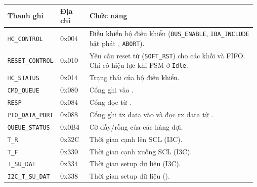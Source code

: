 \begin{longtable}{L{4.6cm} C{2.0cm} L{6.4cm}}
	\toprule
	\textbf{Thanh ghi}       & \textbf{Địa chỉ} & \textbf{Chức năng}                                                                                                          \\
	\midrule
	\endhead
	\texttt{HC\_CONTROL}     & 0x004            & Điều khiển bộ điều khiển (\texttt{BUS\_ENABLE}, \texttt{IBA\_INCLUDE} bật phát \IThreeCBroadcastAddress{}, \texttt{ABORT}). \\
	\texttt{RESET\_CONTROL}  & 0x010            & Yêu cầu reset từ \Host{} (\texttt{SOFT\_RST}) cho các khối và FIFO. Chỉ có hiệu lực khi FSM ở \texttt{Idle}.                \\
	\texttt{HC\_STATUS}      & 0x014            & Trạng thái của bộ điều khiển.                                                                                               \\
	\texttt{CMD\_QUEUE}      & 0x080            & Cổng ghi \CommandDescriptor{} vào \CommandFifo{}.                                                                           \\
	\texttt{RESP}            & 0x084            & Cổng đọc \ResponseDescriptor{} từ \ResponseFifo{}.                                                                          \\
	\texttt{PIO\_DATA\_PORT} & 0x088            & Cổng ghi \gls{tx} data vào \TxFifo{} và đọc \gls{rx} data từ \RxFifo{}.                                                    \\
	\texttt{QUEUE\_STATUS}   & 0x0B4            & Cờ đầy/rỗng của các hàng đợi.                                                                                               \\
	\texttt{T\_R}            & 0x32C            & Thời gian cạnh lên SCL (I3C).                                                                                               \\
	\texttt{T\_F}            & 0x330            & Thời gian cạnh xuống SCL (I3C).                                                                                             \\
	\texttt{T\_SU\_DAT}      & 0x334            & Thời gian setup dữ liệu (I3C).                                                                                              \\
	\texttt{I2C\_T\_SU\_DAT} & 0x338            & Thời gian setup dữ liệu (\iic{}).                                                                                           \\

\end{longtable}
